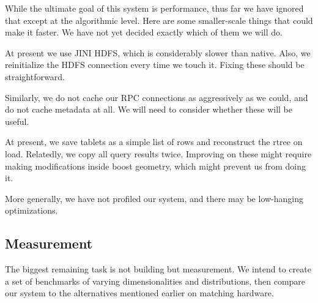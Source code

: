 \documentclass[11pt]{article}
\begin{document}
While the ultimate goal of this system is performance, thus far we have ignored that except at the algorithmic level. Here are some smaller-scale things that could make it faster. We have not yet decided exactly which of them we will do.


At present we use JINI HDFS, which is considerably slower than native. Also, we reinitialize the HDFS connection every time we touch it. Fixing these should be straightforward.

Similarly, we do not cache our RPC connections as aggressively as we could, and do not cache metadata at all. We will need to consider whether these will be useful.

At present, we save tablets as a simple list of rows and reconstruct the rtree on load. Relatedly, we copy all query results twice. Improving on these might require making modifications inside boost geometry, which might prevent us from doing it.

More generally, we have not profiled our system, and there may be low-hanging optimizations.

\subsection{Measurement}

The biggest remaining task is not building but measurement. We intend to create a set of benchmarks of varying dimensionalities and distributions, then compare our system to the alternatives mentioned earlier on matching hardware.
\end{document}
